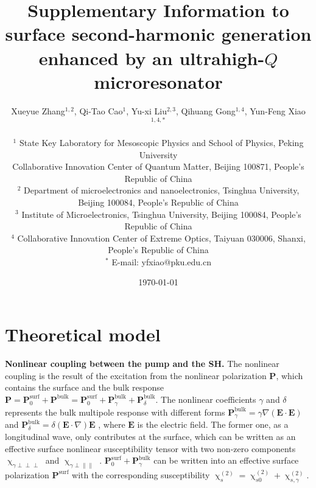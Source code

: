 \documentclass[a4paper,8pt,hyperref, aps, prl]{article}
\title{\bfseries \Large 
Supplementary Information to surface second-harmonic generation enhanced by an ultrahigh-$Q$ microresonator
}
\author{\normalsize  Xueyue Zhang$^{1,2}$, Qi-Tao Cao$^{1}$, Yu-xi Liu$^{2,3}$, Qihuang Gong$^{1,4}$, Yun-Feng Xiao$^{1,4,*}$ \\
  \\
\normalsize $^1$ State Key Laboratory for Mesoscopic Physics and School of Physics, Peking University \\
\normalsize Collaborative Innovation Center of Quantum Matter, Beijing 100871, People's Republic of China \\
\normalsize $^2$ Department of microelectronics and nanoelectronics, Tsinghua University, Beijing 100084, People’s Republic of China \\
\normalsize $^3$ Institute of Microelectronics, Tsinghua University, Beijing 100084, People’s Republic of China \\
\normalsize $^4$ Collaborative Innovation Center of Extreme Optics, Taiyuan 030006, Shanxi, People’s Republic of China \\
\normalsize $^*$ E-mail: yfxiao@pku.edu.cn
}
\date{\normalsize \today}
\begin{document}
\maketitle

\section{Theoretical model}

\textbf{Nonlinear coupling between the pump and the SH. }
The nonlinear coupling is the result of the excitation from the nonlinear polarization $\mathbf{P}$, which contains the surface and the bulk response $\mathbf{P} = \mathbf{P}^{\mathrm{surf}}_0+\mathbf{P}^{\mathrm{bulk}} = \mathbf{P}^{\mathrm{surf}}_0+\mathbf{P}^{\mathrm{bulk}}_\gamma+\mathbf{P}^{\mathrm{bulk}}_\delta$. The nonlinear coefficients $\gamma$ and $\delta$ represents the bulk multipole response with different forms $\mathbf{P}^{\mathrm{bulk}}_\gamma =  \gamma\nabla(\mathbf{E}\cdot\mathbf{E})$ and $\mathbf{P}^{\mathrm{bulk}}_\delta = \delta(\mathbf{E}\cdot\nabla)\mathbf{E}$ \cite{bloembergen1968optical}, where $\mathbf{E}$ is the electric field. The former one, as a longitudinal wave, only contributes at the surface, which can be written as an effective surface nonlinear susceptibility tensor with two non-zero components $\upchi_{\gamma \perp \perp \perp}$ and $\upchi_{\gamma \perp \parallel \parallel}$ \cite{heinz1991second}. $\mathbf{P}^{\mathrm{surf}}_0+\mathbf{P}^{\mathrm{bulk}}_\gamma$ can be written into an effective surface polarization $\mathbf{P}^{\mathrm{surf}}$ with the corresponding susceptibility $\upchi^{(2)}_s = \upchi^{(2)}_{s0}+\upchi^{(2)}_{s,\gamma}$.






\end{document}
